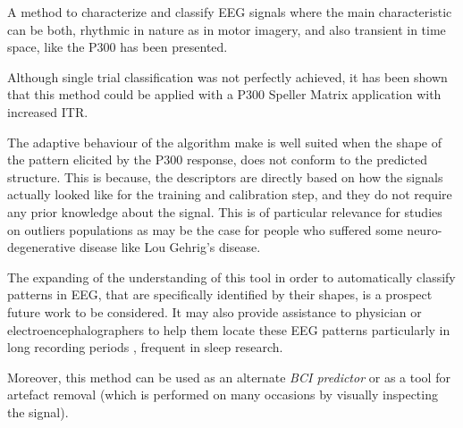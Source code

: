 \documentclass[entropy,article,submit,moreauthors,pdftex,10pt,a4paper]{mdpi}
\begin{document}
A method to characterize and classify EEG signals where the main characteristic can be both, rhythmic in nature as in motor imagery, and also transient in time space, like the P300 has been presented.

Although single trial classification was not perfectly achieved, it has been shown that this method could be applied with a P300 Speller Matrix application with increased ITR.


The adaptive behaviour of the algorithm make is well suited when the shape of the pattern elicited by the P300 response, does not conform to the predicted structure.  This is because, the descriptors are directly based on how the signals actually looked like for the training and calibration step, and they do not require any prior knowledge about the signal.  This is of particular relevance for studies on outliers populations as may be the case for people who suffered some neuro-degenerative disease like Lou Gehrig's disease.

The expanding of the understanding of this tool in order to automatically classify patterns in EEG, that are specifically identified by their shapes, is a prospect future work to be considered.  It may also provide  assistance to physician or electroencephalographers to help them locate these EEG patterns particularly in long recording periods \citep{Hartman2005}, frequent in sleep research.

Moreover, this method can be used as an alternate \textit{BCI predictor} \citep{Clerc} or as a tool for artefact removal (which is performed on many occasions by visually inspecting the signal).

%
%
%
%
\end{document}
